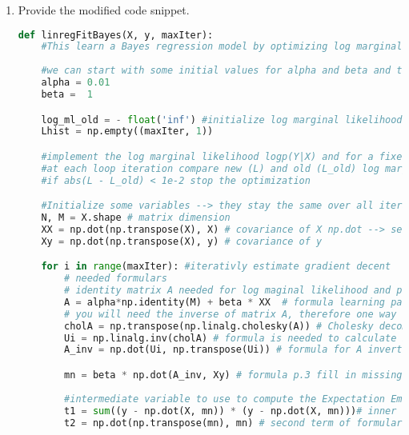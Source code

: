 \documentclass{homework}
\begin{document}
\begin{enumerate}
	\item Provide the modified code snippet.
		\begin{lstlisting}[language=Python, caption=DT Bayes Linear Regression, basicstyle=\tiny]
def linregFitBayes(X, y, maxIter):
    #This learn a Bayes regression model by optimizing log marginal likelihood. 
    
    #we can start with some initial values for alpha and beta and then change them iteratively based on data
    alpha = 0.01
    beta =  1

    log_ml_old = - float('inf') #initialize log marginal likelihood
    Lhist = np.empty((maxIter, 1))

    #implement the log marginal likelihood logp(Y|X) and for a fixed number of iteration optimize it 
    #at each loop iteration compare new (L) and old (L_old) log marginal likelihood
    #if abs(L - L_old) < 1e-2 stop the optimization

    #Initialize some variables --> they stay the same over all iterations, therfore out of the loop
    N, M = X.shape # matrix dimension
    XX = np.dot(np.transpose(X), X) # covariance of X np.dot --> see https://numpy.org/doc/stable/reference/generated/numpy.dot.html
    Xy = np.dot(np.transpose(X), y) # covariance of y

    for i in range(maxIter): #iterativly estimate gradient decent
        # needed formulars
        # identity matrix A needed for log maginal likelihood and prediction later p. 3
        A = alpha*np.identity(M) + beta * XX  # formula learning parameters p. 3 formula np.identity --> see https://numpy.org/doc/stable/reference/generated/numpy.identity.html
        # you will need the inverse of matrix A, therefore one way of computing it is using the Cholesky decomposition
        cholA = np.transpose(np.linalg.cholesky(A)) # Cholesky decomposition formula to get the inverse of A see --> https://numpy.org/doc/stable/reference/generated/numpy.linalg.cholesky.html
        Ui = np.linalg.inv(cholA) # formula is needed to calculate inverse of A
        A_inv = np.dot(Ui, np.transpose(Ui)) # formula for A inverted p.3

        mn = beta * np.dot(A_inv, Xy) # formula p.3 fill in missing parameter
        
        #intermediate variable to use to compute the Expectation Em        
        t1 = sum((y - np.dot(X, mn)) * (y - np.dot(X, mn)))# inner term of formular p.3
        t2 = np.dot(np.transpose(mn), mn) # second term of formular p. 3 --> all the variables are devided by 2 in the formular --> devide them once at the end


\end{lstlisting}
\end{enumerate}
\end{document}
